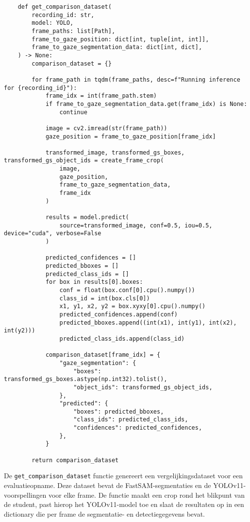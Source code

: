 \begin{listing}[H]
  \fontsize{10pt}{9.6pt}
  \begin{verbatim}
    def get_comparison_dataset(
        recording_id: str,
        model: YOLO,
        frame_paths: list[Path],
        frame_to_gaze_position: dict[int, tuple[int, int]],
        frame_to_gaze_segmentation_data: dict[int, dict],
    ) -> None:
        comparison_dataset = {}
        
        for frame_path in tqdm(frame_paths, desc=f"Running inference for {recording_id}"):
            frame_idx = int(frame_path.stem)
            if frame_to_gaze_segmentation_data.get(frame_idx) is None:
                continue

            image = cv2.imread(str(frame_path))
            gaze_position = frame_to_gaze_position[frame_idx]

            transformed_image, transformed_gs_boxes, transformed_gs_object_ids = create_frame_crop(
                image,
                gaze_position,
                frame_to_gaze_segmentation_data,
                frame_idx
            )

            results = model.predict(
                source=transformed_image, conf=0.5, iou=0.5, device="cuda", verbose=False
            )

            predicted_confidences = []
            predicted_bboxes = []
            predicted_class_ids = []
            for box in results[0].boxes:
                conf = float(box.conf[0].cpu().numpy())
                class_id = int(box.cls[0])
                x1, y1, x2, y2 = box.xyxy[0].cpu().numpy()
                predicted_confidences.append(conf)
                predicted_bboxes.append((int(x1), int(y1), int(x2), int(y2)))
                predicted_class_ids.append(class_id)

            comparison_dataset[frame_idx] = {
                "gaze_segmentation": {
                    "boxes": transformed_gs_boxes.astype(np.int32).tolist(),
                    "object_ids": transformed_gs_object_ids,
                },
                "predicted": {
                    "boxes": predicted_bboxes,
                    "class_ids": predicted_class_ids,
                    "confidences": predicted_confidences,
                },
            }

        return comparison_dataset
  \end{verbatim}
  \caption[Functie voor het creëren van vergelijkingsdataset voor een evaluatieopname]{
    \label{listing:get-comparison-set}
    De \texttt{get\_comparison\_dataset} functie genereert een vergelijkingsdataset voor een evaluatieopname.
    Deze dataset bevat de FastSAM-segmentaties en de YOLOv11-voorspellingen voor elke frame.
    De functie maakt een crop rond het blikpunt van de student, past hierop het YOLOv11-model toe
    en slaat de resultaten op in een dictionary die per frame de segmentatie- en detectiegegevens bevat.
    }
\end{listing}

